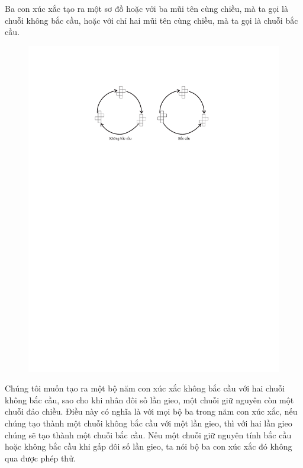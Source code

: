 \begin{multicols}{2}
	\vskip 0.05cm
	Ba con xúc xắc tạo ra một sơ đồ hoặc với ba mũi tên cùng chiều, mà ta gọi là chuỗi không bắc cầu, hoặc với chỉ hai mũi tên cùng chiều, mà ta gọi là chuỗi bắc cầu.
	\begin{figure}[H]
		\vspace*{-10pt}
		\centering
		\captionsetup{labelformat= empty, justification=centering}
		\includegraphics[width=1\linewidth]{13}
		\vspace*{-25pt}
	\end{figure}
	Chúng tôi muốn tạo ra một bộ năm con xúc xắc không bắc cầu với hai chuỗi không bắc cầu, sao cho khi nhân đôi số lần gieo, một chuỗi giữ nguyên còn một chuỗi đảo chiều.
	\vskip 0.05cm
	Điều này có nghĩa là với mọi bộ ba trong năm con xúc xắc, nếu chúng tạo thành một chuỗi không bắc cầu với một lần gieo, thì với hai lần gieo chúng sẽ tạo thành một chuỗi bắc cầu. Nếu một chuỗi giữ nguyên tính bắc cầu hoặc không bắc cầu khi gấp đôi số lần gieo, ta nói bộ ba con xúc xắc đó không qua được phép thử.

\end{multicols}
